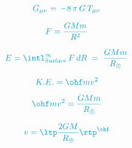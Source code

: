 \documentclass[12pt,letterpaper]{article}
\begin{document}
{\Large


$$
{\color{cyan}
G_{\mu \nu} = \, -8 \, \pi \, G \, T_{\mu \nu}
}
$$


$$
{\color{cyan}
F = \frac{G M m}{R^2}
}
$$


$$
{\color{cyan}
E = \intl_{\rm Surface}^{\infty} \, F \, dR \; = \; \frac{G M
  m}{R_\oplus}
}
$$

$$
{\color{cyan}
K.E. =  \ohf m v^2
}
$$

$$
{\color{cyan}
\ohf m v^2 = \frac{G M m}{R_\oplus}
}
$$

$$
{\color{cyan}
v = \ltp \frac{2 G M}{R_\oplus} \rtp^\ohf
}
$$

}
\end{document}
